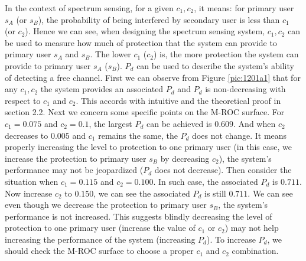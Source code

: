In the context of spectrum sensing, for a given $c_1, c_2$, it means: for primary user $s_A$ (or $s_B$), the probability of being interfered by secondary user is less than $c_1$ (or $c_2$). Hence we can see, when designing the spectrum sensing system,  $c_1, c_2$ can be used to measure how much of protection that the system can provide to primary user $s_A$ and $s_B$.  The lower $c_1$ ($c_2$) is, the more protection the system can provide to primary user $s_A$ ($s_B$). $P_d$ can be used to describe the system's ability of detecting a free channel.   First we can observe from Figure \ref{pic:1201a1} that for any $c_1, c_2$ the system provides an associated $P_d$ and $P_d$ is non-decreasing with respect to $c_1$ and $c_2$. This accords with intuitive and the theoretical proof in section 2.2.     
Next we concern some specific points on the M-ROC surface. For $c_1 = 0.075$ and $c_2  = 0.1$, the largest $P_d$ can be achieved is $0.609$. And when $c_2$ decreases to $0.005$ and  $c_1$ remains the same, the $P_d$ does not change.   
 It means properly increasing the level to protection to one primary user (in this case, we increase the protection to primary user $s_B$ by decreasing $c_2$), the system's performance may not be jeopardized ($P_d$ does not decrease).  
Then consider the situation when $c_1 = 0.115$ and $c_2 = 0.100$. In such case, the associated $P_d$ is $0.711$. Now increase $c_2$ to $0.150$, we can see the associated $P_d$ is still $0.711$. We can see even though we decrease the protection to primary user $s_B$, the system's performance is not increased.  
This suggests blindly decreasing the level of protection to one primary user (increase the value of $c_1$ or $c_2$) may not help increasing the performance of the system (increasing $P_d$). To increase $P_d$, we should check the M-ROC surface to choose a proper $c_1$ and $c_2$ combination.

